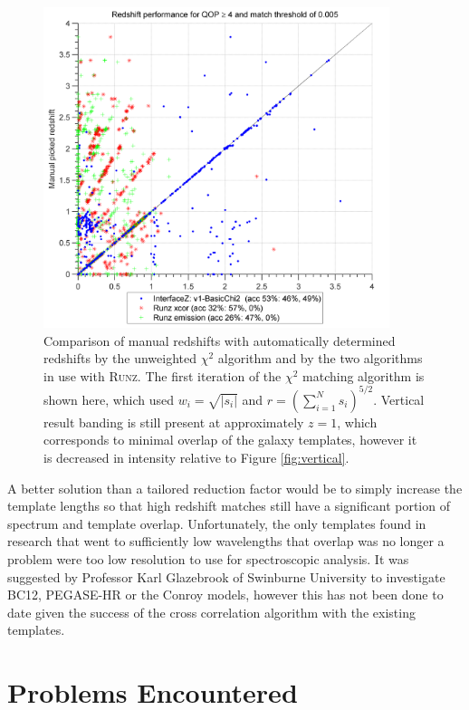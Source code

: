 \documentclass[titlesmallcaps, examinerscopy, copyrightpage]{uqthesis}
\newcommand{\runz}{\textsc{Runz}}
\newcommand{\brac}[1]{\left( #1 \right)}
\newcommand\abs[1]{\left|#1\right|}
\begin{document}
\begin{figure}[ht!]
\includegraphics[width=0.9\textwidth]{images/Fullv1-BasicChi2.png} 
\centering
\caption{Comparison of manual redshifts with automatically determined redshifts by the unweighted $\chi^2$ algorithm and by the two algorithms in use with \runz{}. The first iteration of the $\chi^2$ matching algorithm is shown here, which used $w_i = \sqrt{\abs{s_i}}$ and $r = \brac{\sum_{i=1}^N s_i}^{5/2}$. Vertical result banding is still present at approximately $z=1$, which corresponds to minimal overlap of the galaxy templates, however it is decreased in intensity relative to Figure \ref{fig:vertical}.}
\label{fig:novertical}
\end{figure}

A better solution than a tailored reduction factor would be to simply increase the template lengths so that high redshift matches still have a significant portion of spectrum and template overlap. Unfortunately, the only templates found in research that went to sufficiently low wavelengths that overlap was no longer a problem were too low resolution to use for spectroscopic analysis. It was suggested by Professor Karl Glazebrook of Swinburne University to investigate BC12, PEGASE-HR or the Conroy models, however this has not been done to date given the success of the cross correlation algorithm with the existing templates.

\pagebreak
\section{Problems Encountered}
\end{document}
